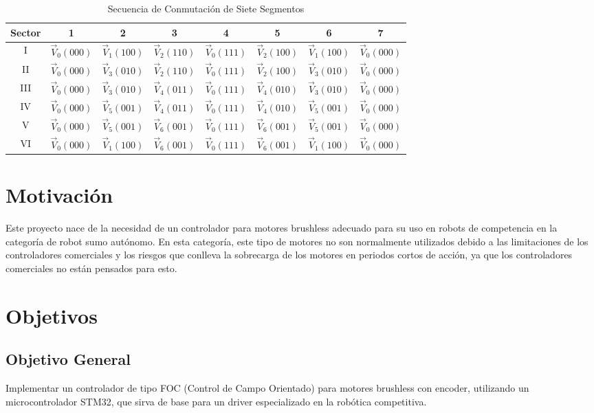\documentclass[11pt]{report}
\begin{document}
\begin{table}[htbp]
	\centering
	\caption{Secuencia de Conmutación de Siete Segmentos}
	\begin{tabular}{ c c c c c c c c }
		\hline
		\textbf{Sector} & \textbf{1}       & \textbf{2}       & \textbf{3}       & \textbf{4}       & \textbf{5}       & \textbf{6}       & \textbf{7}       \\
		\hline
		I               & $\vec{V}_0(000)$ & $\vec{V}_1(100)$ & $\vec{V}_2(110)$ & $\vec{V}_0(111)$ & $\vec{V}_2(100)$ & $\vec{V}_1(100)$ & $\vec{V}_0(000)$ \\
		II              & $\vec{V}_0(000)$ & $\vec{V}_3(010)$ & $\vec{V}_2(110)$ & $\vec{V}_0(111)$ & $\vec{V}_2(100)$ & $\vec{V}_3(010)$ & $\vec{V}_0(000)$ \\
		III             & $\vec{V}_0(000)$ & $\vec{V}_3(010)$ & $\vec{V}_4(011)$ & $\vec{V}_0(111)$ & $\vec{V}_4(010)$ & $\vec{V}_3(010)$ & $\vec{V}_0(000)$ \\
		IV              & $\vec{V}_0(000)$ & $\vec{V}_5(001)$ & $\vec{V}_4(011)$ & $\vec{V}_0(111)$ & $\vec{V}_4(010)$ & $\vec{V}_5(001)$ & $\vec{V}_0(000)$ \\
		V               & $\vec{V}_0(000)$ & $\vec{V}_5(001)$ & $\vec{V}_6(001)$ & $\vec{V}_0(111)$ & $\vec{V}_6(001)$ & $\vec{V}_5(001)$ & $\vec{V}_0(000)$ \\
		VI              & $\vec{V}_0(000)$ & $\vec{V}_1(100)$ & $\vec{V}_6(001)$ & $\vec{V}_0(111)$ & $\vec{V}_6(001)$ & $\vec{V}_1(100)$ & $\vec{V}_0(000)$ \\
		\hline
	\end{tabular}
\end{table}

\newpage
\section{Motivación}
Este proyecto nace de la necesidad de un controlador para motores brushless adecuado para su uso en robots de competencia en la categoría de robot sumo autónomo. En esta categoría, este tipo de motores no son normalmente utilizados debido a las limitaciones de los controladores comerciales y los riesgos que conlleva la sobrecarga de los motores en periodos cortos de acción, ya que los controladores comerciales no están pensados para esto.

\section{Objetivos}
\subsection{Objetivo General}
Implementar un controlador de tipo FOC (Control de Campo Orientado) para motores brushless con encoder, utilizando un microcontrolador STM32, que sirva de base para un driver especializado en la robótica competitiva.
\end{document}
